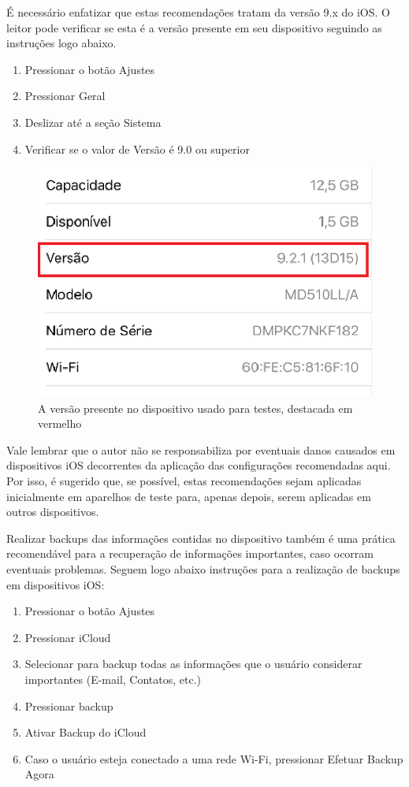 \'E necess\'ario enfatizar que estas recomenda\c c\~oes tratam da vers\~ao 9.x do iOS. O leitor pode verificar se esta \'e a vers\~ao presente em seu dispositivo seguindo as instru\c c\~oes logo abaixo.

\begin{enumerate}
\item Pressionar o bot\~ao Ajustes
\item Pressionar Geral
\item Deslizar at\'e a se\c c\~ao Sistema
\item Verificar se o valor de Vers\~ao \'e 9.0 ou superior
\end{enumerate}

\begin{figure}[h]
  \centering
  \includegraphics{imagem2.eps}
  \caption{A vers\~ao presente no dispositivo usado para testes, destacada em vermelho}
\end{figure}

Vale lembrar que o autor n\~ao se responsabiliza por eventuais danos causados em dispositivos iOS decorrentes da aplica\c c\~ao das configura\c c\~oes recomendadas aqui. Por isso, \'e sugerido que, se poss\'ivel, estas recomenda\c c\~oes sejam aplicadas inicialmente em aparelhos de teste para, apenas depois, serem aplicadas em outros dispositivos. 

Realizar backups das informa\c c\~oes contidas no dispositivo tamb\'em \'e uma pr\'atica recomend\'avel para a recupera\c c\~ao de informa\c c\~oes importantes, caso ocorram eventuais problemas. Seguem logo abaixo instru\c c\~oes para a realiza\c c\~ao de backups em dispositivos iOS:

\begin{enumerate}
\item Pressionar o bot\~ao Ajustes
\item Pressionar iCloud
\item Selecionar para backup todas as informa\c c\~oes que o usu\'ario considerar importantes (E-mail, Contatos, etc.)
\item Pressionar backup
\item Ativar Backup do iCloud
\item Caso o usu\'ario esteja conectado a uma rede Wi-Fi, pressionar Efetuar Backup Agora   
\end{enumerate}
